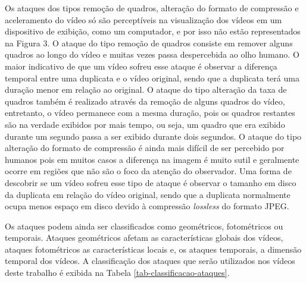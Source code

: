 Os ataques dos tipos remoção de quadros, alteração do formato de compressão e aceleramento do vídeo só são perceptíveis na visualização dos vídeos em um dispositivo de exibição, como um computador, e por isso não estão representados na Figura 3. O ataque do tipo remoção de quadros consiste em remover alguns quadros ao longo do vídeo e muitas vezes passa despercebida ao olho humano. O maior indicativo de que um vídeo sofreu esse ataque é observar a diferença temporal entre uma duplicata e o vídeo original, sendo que a duplicata terá uma duração menor em relação ao original. O ataque do tipo alteração da taxa de quadros também é realizado através da remoção de alguns quadros do vídeo, entretanto, o vídeo permanece com a mesma duração, pois os quadros restantes são na verdade exibidos por mais tempo, ou seja, um quadro que era exibido durante um segundo passa a ser exibido durante dois segundos. O ataque do tipo alteração do formato de compressão é ainda mais difícil de ser percebido por humanos pois em muitos casos a diferença na imagem é muito sutil e geralmente ocorre em regiões que não são o foco da atenção do observador. Uma forma de descobrir se um vídeo sofreu esse tipo de ataque é observar o tamanho em disco da duplicata em relação do vídeo original, sendo que a duplicata normalmente ocupa menos espaço em disco devido à compressão \textit{lossless} do formato JPEG.

Os ataques podem ainda ser classificados como geométricos, fotométricos ou temporais. Ataques geométricos afetam as características globais dos vídeos, ataques fotométricos as características locais e, os ataques temporais, a dimensão temporal dos vídeos. A classificação dos ataques que serão utilizados nos vídeos deste trabalho é exibida na Tabela \ref{tab-classificacao-ataques}.

